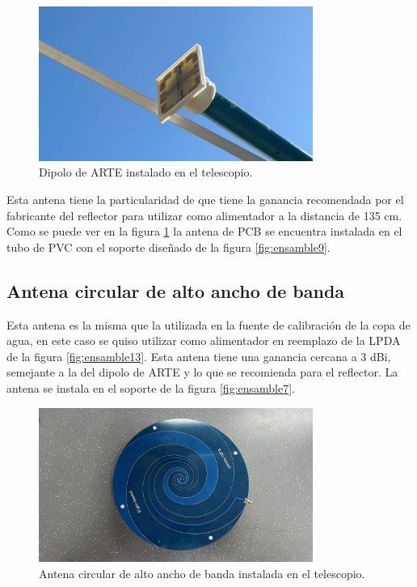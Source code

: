 \begin{figure}
    \centering
    \includegraphics[width=0.8\textwidth]{img/feed}
    \caption{Dipolo de ARTE instalado en el telescopio.}
    \label{fig:ensamble14}
\end{figure}

Esta antena tiene la particularidad de que tiene la ganancia recomendada por el fabricante del reflector para utilizar como alimentador a la distancia de 135 cm. Como se puede ver en la figura \ref{fig:ensamble14} la antena de PCB se encuentra instalada en el tubo de PVC con el soporte diseñado de la figura \ref{fig:ensamble9}.\\

\subsection{Antena circular de alto ancho de banda}

Esta antena es la misma que la utilizada en la fuente de calibración de la copa de agua, en este caso se quiso utilizar como alimentador en reemplazo de la LPDA de la figura \ref{fig:ensamble13}. Esta antena tiene una ganancia cercana a 3 dBi, semejante a la del dipolo de ARTE y lo que se recomienda para el reflector. La antena se instala en el soporte de la figura \ref{fig:ensamble7}.\\

\begin{figure}
    \centering
    \includegraphics[width=0.8\textwidth]{img/paletaFeed}
    \caption{Antena circular de alto ancho de banda instalada en el telescopio.}
    \label{fig:ensamble15}
\end{figure}


